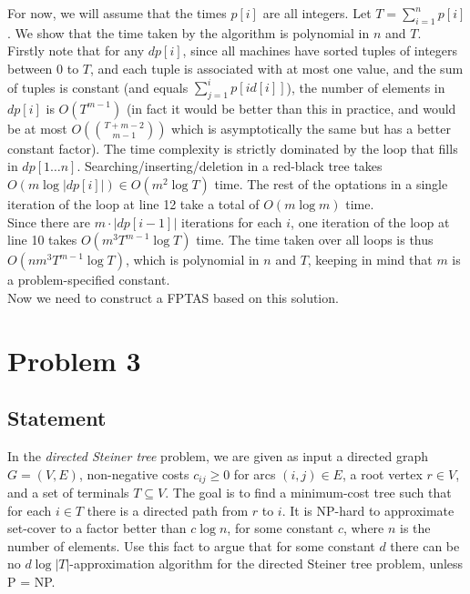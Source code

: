 \documentclass[a4paper]{article}
\newcommand{\nl}{\vspace{0.2cm}\\}
\begin{document}
For now, we will assume that the times $p[i]$ are all integers. Let $T = \sum_{i = 1}^n p[i]$. We show that the time taken by the algorithm is polynomial in $n$ and $T$.\nl
Firstly note that for any $dp[i]$, since all machines have sorted tuples of integers between $0$ to $T$, and each tuple is associated with at most one value, and the sum of tuples is constant (and
equals $\sum_{j = 1}^i p[id[i]]$), the number of elements in $dp[i]$ is $O(T^{m - 1})$ (in fact it would be better than this in practice, and would be at most $O(\binom{T + m - 2}{m - 1})$ which is asymptotically
the same but has a better constant factor).
The time complexity is strictly dominated by the loop that fills in $dp[1 \ldots n]$. Searching/inserting/deletion in a red-black tree takes $O(m \log |dp[i]|) \in O(m^2 \log T)$ time. The rest of
the optations in a single iteration of the loop at line 12 take a total of $O(m \log m)$ time.\nl
Since there are $m \cdot |dp[i - 1]|$ iterations for each $i$, one iteration of the loop at line 10 takes $O(m^3 T^{m - 1} \log T)$ time. The time taken over all loops is thus $O(n m^3 T^{m - 1}
\log T)$, which is polynomial in $n$ and $T$, keeping in mind that $m$ is a problem-specified constant.\nl

Now we need to construct a FPTAS based on this solution.\nl

\newpage

\section{Problem 3}
\subsection{Statement}
In the \emph{directed Steiner tree} problem, we are given as input a directed graph $G = (V, E)$, non-negative costs $c_{ij} \ge 0$ for arcs $(i, j) \in E$, a root vertex $r \in V$, and a set of
terminals $T \subseteq V$. The goal is to find a minimum-cost tree such that for each $i\in T$ there is a directed path from $r$ to $i$. It is NP-hard to approximate set-cover to a factor better than
$c\log n$, for some constant $c$, where $n$ is the number of elements. Use this fact to argue that for some constant $d$ there can be no $d \log |T|$-approximation algorithm for the directed Steiner tree problem, unless P = NP.
\end{document}
